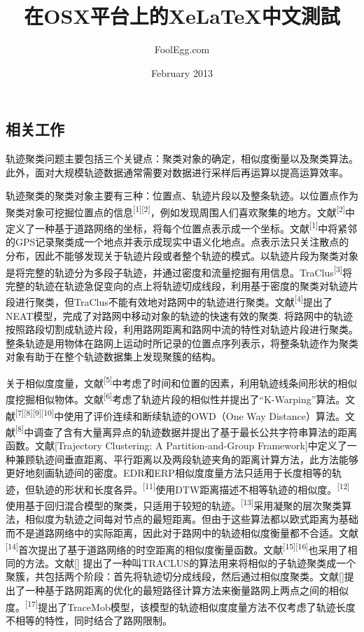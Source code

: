 \documentclass[]{article}
\title{\huge 在OSX平台上的XeLaTeX中文測試} %
\author{FoolEgg.com} 		%
\date{February 2013} 		%
\author{}
\date{}
\begin{document}
\subsection{相关工作}\label{ux76f8ux5173ux5de5ux4f5c}

轨迹聚类问题主要包括三个关键点：聚类对象的确定，相似度衡量以及聚类算法。此外，面对大规模轨迹数据通常需要对数据进行采样后再运算以提高运算效率。

轨迹聚类的聚类对象主要有三种：位置点、轨迹片段以及整条轨迹。以位置点作为聚类对象可挖掘位置点的信息\textsuperscript{{[}1{]}}\textsuperscript{{[}2{]}}，例如发现周围人们喜欢聚集的地方。文献\textsuperscript{{[}2{]}}中定义了一种基于道路网络的坐标，将每个位置点表示成一个坐标。文献\textsuperscript{{[}1{]}}中将紧邻的GPS记录聚类成一个地点并表示成现实中语义化地点。点表示法只关注散点的分布，因此不能够发现关于轨迹片段或者整个轨迹的模式。以轨迹片段为聚类对象是将完整的轨迹分为多段子轨迹，并通过密度和流量挖掘有用信息。TraClus\textsuperscript{{[}3{]}}将完整的轨迹在轨迹急促变向的点上将轨迹切成线段，利用基于密度的聚类对轨迹片段进行聚类，但TraClus不能有效地对路网中的轨迹进行聚类。文献\textsuperscript{{[}4{]}}提出了NEAT模型，完成了对路网中移动对象的轨迹的快速有效的聚类.
将路网中的轨迹按照路段切割成轨迹片段，利用路网距离和路网中流的特性对轨迹片段进行聚类。整条轨迹是用物体在路网上运动时所记录的位置点序列表示，将整条轨迹作为聚类对象有助于在整个轨迹数据集上发现聚簇的结构。

关于相似度度量，文献\textsuperscript{{[}5{]}}中考虑了时间和位置的因素，利用轨迹线条间形状的相似度挖掘相似物体。文献\textsuperscript{{[}6{]}}考虑了轨迹片段的相似性并提出了``K-Warping''算法。文献\textsuperscript{{[}7{]}}\textsuperscript{{[}8{]}}\textsuperscript{{[}9{]}}\textsuperscript{{[}10{]}}中使用了评价连续和断续轨迹的OWD（One
Way
Distance）算法。文献\textsuperscript{{[}8{]}}中调查了含有大量离异点的轨迹数据并提出了基于最长公共字符串算法的距离函数。文献{[}Trajectory
Clustering: A Partition-and-Group
Framework{]}中定义了一种兼顾轨迹间垂直距离、平行距离以及两段轨迹夹角的距离计算方法，此方法能够更好地刻画轨迹间的密度。EDR和ERP相似度度量方法只适用于长度相等的轨迹，但轨迹的形状和长度各异。\textsuperscript{{[}11{]}}使用DTW距离描述不相等轨迹的相似度。\textsuperscript{{[}12{]}}使用基于回归混合模型的聚类，只适用于较短的轨迹。\textsuperscript{{[}13{]}}采用凝聚的层次聚类算法，相似度为轨迹之间每对节点的最短距离。但由于这些算法都以欧式距离为基础而不是道路网络中的实际距离，因此对于路网中的轨迹相似度衡量都不合适。文献\textsuperscript{{[}14{]}}首次提出了基于道路网络的时空距离的相似度衡量函数。文献\textsuperscript{{[}15{]}}\textsuperscript{{[}16{]}}也采用了相同的方法。文献{[}{]}
提出了一种叫TRACLUS的算法用来将相似的子轨迹聚类成一个聚簇，共包括两个阶段：首先将轨迹切分成线段，然后通过相似度聚类。文献{[}{]}提出了一种基于路网距离的优化的最短路径计算方法来衡量路网上两点之间的相似度。\textsuperscript{{[}17{]}}提出了TraceMob模型，该模型的轨迹相似度度量方法不仅考虑了轨迹长度不相等的特性，同时结合了路网限制。
\end{document}
